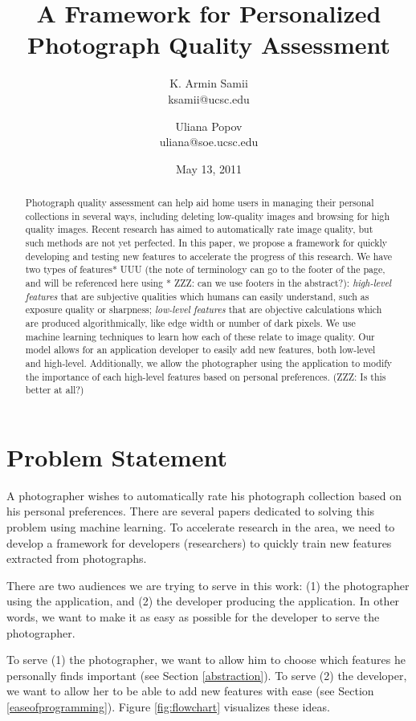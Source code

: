 \documentclass[11pt,letter]{article}
\title{A Framework for Personalized Photograph Quality Assessment}
\author{
K. Armin Samii \\
ksamii@ucsc.edu
\and
Uliana Popov \\
uliana@soe.ucsc.edu}
\date{May 13, 2011}
\begin{document}
\maketitle
\begin{abstract}
Photograph quality assessment can help aid home users in managing their personal collections in several ways, including deleting low-quality images and browsing for high quality images. Recent research has aimed to automatically rate image quality, but such methods are not yet perfected. In this paper, we propose a framework for quickly developing and testing new features to accelerate the progress of this research. We have two types of features* UUU (the note of terminology can go to the footer of the page, and will be referenced here using * ZZZ: can we use footers in the abstract?): \textit{high-level features} that are subjective qualities which humans can easily understand, such as exposure quality or sharpness; \textit{low-level features} that are objective calculations which are produced algorithmically, like edge width or number of dark pixels. We use machine learning techniques to learn how each of these relate to image quality. Our model allows for an application developer to easily add new features, both low-level and high-level. Additionally, we allow the photographer using the application to modify the importance of each high-level features based on personal preferences. (ZZZ: Is this better at all?)

\end{abstract}

\section{Problem Statement}
A photographer wishes to automatically rate his photograph collection based on his personal preferences. There are several papers dedicated to solving this problem using machine learning\cite{springerlink:10.1007/11744078_23}\cite{springerlink:10.1007/978-3-642-10543-2_23}\cite{Yeh:2010:PPR:1873951.1873963}. To accelerate research in the area, we need to develop a framework for developers (researchers) to quickly train new features extracted from photographs.

There are two audiences we are trying to serve in this work: (1) the photographer using the application, and (2) the developer producing the application. In other words, we want to make it as easy as possible for the developer to serve the photographer.

To serve (1) the photographer, we want to allow him to choose which features he personally finds important (see Section \ref{abstraction}). To serve (2) the developer, we want to allow her to be able to add new features with ease (see Section \ref{easeofprogramming}). Figure \ref{fig:flowchart} visualizes these ideas.
\end{document}
